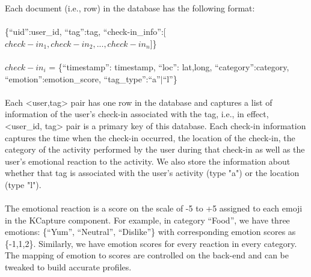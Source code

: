 \documentclass[12pt,letterpaper]{article}
\begin{document}
Each document (i.e., row) in the database has the following format:\\
\\
\{\enquote{uid}:user\_id, \enquote{tag}:tag, \enquote{check-in\_info}:[\(check-in_1, check-in_2, ..., check-in_n\)]\}\\
\\
\(check-in_i\) = \{\enquote{timestamp}: timestamp, \enquote{loc}: lat,long, \enquote{category}:category, \enquote{emotion}:emotion\_score, \enquote{tag\_type}:\enquote{a}$|$\enquote{l}\}
\\\\
Each <user,tag> pair has one row in the database and captures a list of information of the user's check-in associated with the tag, i.e., in effect, <user\_id, tag> pair is a primary key of this database. Each check-in information captures the time when the check-in occurred, the location of the check-in, the category of the activity performed by the user during that check-in as well as the user's emotional reaction to the activity. We also store the information about whether that tag is associated with the user's activity (type "a") or the location (type "l").
\\\\
The emotional reaction is a score on the scale of -5 to +5 assigned to each emoji in the KCapture component. For example, in category \enquote{Food}, we have three emotions: \{\enquote{Yum}, \enquote{Neutral}, \enquote{Dislike}\} with corresponding emotion scores as \{-1,1,2\}. Similarly, we have emotion scores for every reaction in every category. The mapping of emotion to scores are controlled on the back-end and can be tweaked to build accurate profiles.
\end{document}
